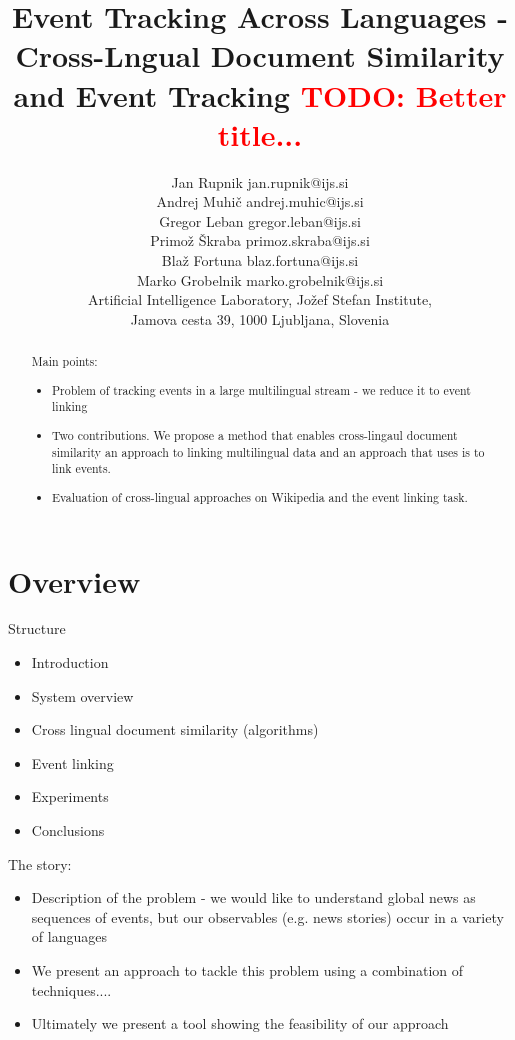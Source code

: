 \documentclass[twoside,11pt]{article}
\newcommand{\todo}[1]{\textcolor{red}{TODO: #1}}
\begin{document}
\title{Event Tracking Across Languages -
Cross-Lngual Document Similarity and Event Tracking \todo{Better title...}}

\author{\name Jan Rupnik \email jan.rupnik@ijs.si \\
       \name Andrej Muhi\v{c} \email andrej.muhic@ijs.si \\
       \name Gregor Leban \email gregor.leban@ijs.si \\
       \name Primo\v{z} \v{S}kraba \email primoz.skraba@ijs.si \\
       \name Bla\v{z} Fortuna \email blaz.fortuna@ijs.si \\
       \name Marko Grobelnik \email marko.grobelnik@ijs.si \\
       \addr Artificial Intelligence Laboratory, Jo\v{z}ef Stefan Institute,\\
       Jamova cesta 39, 1000 Ljubljana, Slovenia}

\maketitle

\begin{abstract}
Main points:
\begin{itemize}
\item Problem of tracking events in a large multilingual stream - we reduce it to event linking
\item Two contributions. We propose a method that enables cross-lingaul document similarity an approach to linking multilingual data and an approach that uses is to link events.
\item Evaluation of cross-lingual approaches on Wikipedia and the event linking task.
\end{itemize}

\end{abstract}
\section{Overview}
Structure
\begin{itemize}
\item Introduction
\item System overview
\item Cross lingual document similarity (algorithms)
\item Event linking
\item Experiments
\item Conclusions
\end{itemize}
The story:
\begin{itemize}
\item Description of the problem - we would like to understand global news as sequences of events, but our observables (e.g. news stories) occur in a variety of languages
\item We present an approach to tackle this problem using a combination of techniques....
\item Ultimately we present a tool showing the feasibility of our approach
\end{itemize}
\end{document}
